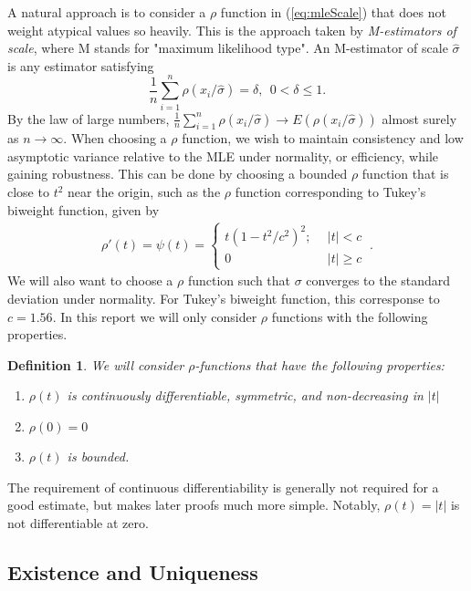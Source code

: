 A natural approach is to consider a $\rho$ function in (\ref{eq:mleScale}) that does not weight atypical values so heavily. This is the approach taken by \textit{M-estimators of scale}, where M stands for "maximum likelihood type". An M-estimator of scale $\hat \sigma$ is any estimator satisfying
\begin{equation}
    \label{eq:mScale}
    \frac{1}{n} \sum_{i=1}^n \rho(x_i/\hat \sigma) = \delta,\ \ 0 < \delta \leq 1.
\end{equation}
By the law of large numbers, $\frac{1}{n} \sum_{i=1}^n \rho(x_i/\hat \sigma) \xrightarrow{} E(\rho(x_i/\hat \sigma))$ almost surely as $n \xrightarrow{} \infty$. When choosing a $\rho$ function, we wish to maintain consistency and low asymptotic variance relative to the MLE under normality, or efficiency, while gaining robustness. This can be done by choosing a bounded $\rho$ function that is close to $t^2$ near the origin, such as the $\rho$ function corresponding to Tukey's biweight function, given by
\begin{align}
    \rho'(t) = \psi(t)  =
    \begin{cases}
        t(1-t^2/c^2)^2; &\ \ |t| < c \\
        0 &\ \ |t| \geq c
    \end{cases}\ .
\end{align}
We will also want to choose a $\rho$ function such that $\sigma$ converges to the standard deviation under normality. For Tukey's biweight function, this corresponse to $c = 1.56$. In this report we will only consider $\rho$ functions with the following properties.
\newtheorem{defn}{Definition}[section]
\begin{defn}
    We will consider $\rho$-functions that have the following properties:
    \begin{enumerate}[(R1)]
        \item $\rho(t)$ is continuously differentiable, symmetric, and non-decreasing in $|t|$
        \item $\rho(0) = 0$
        \item $\rho(t)$ is bounded.
    \end{enumerate}
\end{defn}
The requirement of continuous differentiability is generally not required for a good estimate, but makes later proofs much more simple. Notably, $\rho(t) = |t|$ is not differentiable at zero.

\subsection{Existence and Uniqueness}

